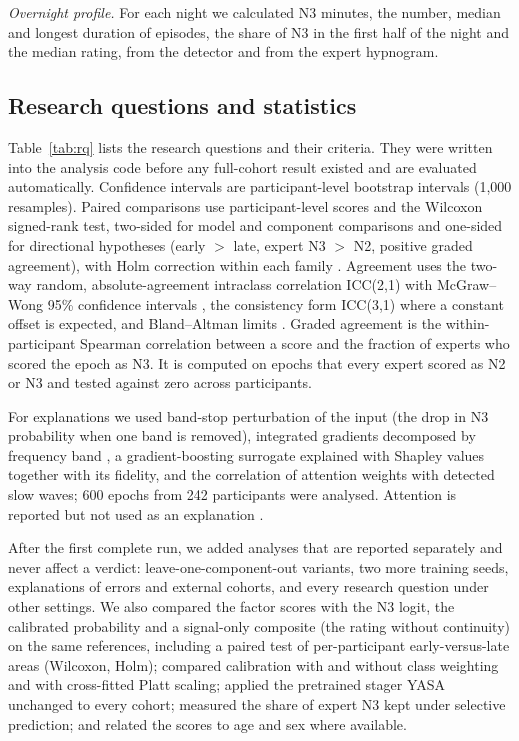 \textit{Overnight profile.} For each night we calculated N3 minutes, the number, median and longest duration of episodes, the share of N3 in the first half of the night and the median rating, from the detector and from the expert hypnogram.

\subsection{Research questions and statistics}
Table~\ref{tab:rq} lists the research questions and their criteria. They were written into the analysis code before any full-cohort result existed and are evaluated automatically. Confidence intervals are participant-level bootstrap intervals (1,000 resamples). Paired comparisons use participant-level scores and the Wilcoxon signed-rank test, two-sided for model and component comparisons and one-sided for directional hypotheses (early $>$ late, expert N3 $>$ N2, positive graded agreement), with Holm correction within each family \cite{holm1979}. Agreement uses the two-way random, absolute-agreement intraclass correlation ICC(2,1) with McGraw--Wong 95\% confidence intervals \cite{shrout1979icc,koo2016icc}, the consistency form ICC(3,1) where a constant offset is expected, and Bland--Altman limits \cite{bland1986agreement}. Graded agreement is the within-participant Spearman correlation between a score and the fraction of experts who scored the epoch as N3. It is computed on epochs that every expert scored as N2 or N3 and tested against zero across participants.

For explanations we used band-stop perturbation of the input (the drop in N3 probability when one band is removed), integrated gradients decomposed by frequency band \cite{sundararajan2017ig}, a gradient-boosting surrogate explained with Shapley values \cite{lundberg2017shap} together with its fidelity, and the correlation of attention weights with detected slow waves; 600 epochs from 242 participants were analysed. Attention is reported but not used as an explanation \cite{jain2019attention}. %

After the first complete run, we added analyses that are reported separately and never affect a verdict: leave-one-component-out variants, two more training seeds, explanations of errors and external cohorts, and every research question under other settings. We also compared the factor scores with the N3 logit, the calibrated probability and a signal-only composite (the rating without continuity) on the same references, including a paired test of per-participant early-versus-late areas (Wilcoxon, Holm); compared calibration with and without class weighting and with cross-fitted Platt scaling; applied the pretrained stager YASA \cite{vallat2021yasa} unchanged to every cohort; measured the share of expert N3 kept under selective prediction; and related the scores to age and sex where available.
